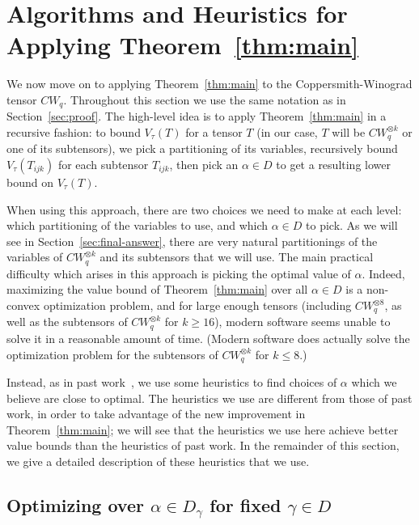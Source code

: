 \documentclass{theoretics}
\begin{document}
\section{Algorithms and Heuristics for Applying Theorem~\ref{thm:main}} \label{sec:heuristics}

We now move on to applying Theorem~\ref{thm:main} to the Coppersmith-Winograd tensor $CW_q$. Throughout this section we use the same notation as in Section~\ref{sec:proof}. The high-level idea is to apply Theorem~\ref{thm:main} in a recursive fashion: to bound $V_\tau(T)$ for a tensor $T$ (in our case, $T$ will be $CW_q^{\otimes k}$ or one of its subtensors), we pick a partitioning of its variables, recursively bound $V_\tau(T_{ijk})$ for each subtensor $T_{ijk}$, then pick an $\alpha \in D$ to get a resulting lower bound on $V_\tau(T)$.

When using this approach, there are two choices we need to make at each level: which partitioning of the variables to use, and which $\alpha \in D$ to pick. As we will see in Section~\ref{sec:final-answer}, there are very natural partitionings of the variables of $CW_q^{\otimes k}$ and its subtensors that we will use. The main practical difficulty which arises in this approach is picking the optimal value of $\alpha$. Indeed, maximizing the value bound of Theorem~\ref{thm:main} over all $\alpha \in D$ is a non-convex optimization problem, and for large enough tensors (including $CW_q^{\otimes 8}$, as well as the subtensors of $CW_q^{\otimes k}$ for $k \geq 16$), modern software seems unable to solve it in a reasonable amount of time. (Modern software does actually solve the optimization problem for the subtensors of $CW_q^{\otimes k}$ for $k\leq 8$.)

Instead, as in past work~\cite{v12,legall}, we use some heuristics to find choices of $\alpha$ which we believe are close to optimal. The heuristics we use are different from those of past work, in order to take advantage of the new improvement in Theorem~\ref{thm:main}; we will see that the heuristics we use here achieve better value bounds than the heuristics of past work. In the remainder of this section, we give a detailed description of these heuristics that we use.

\subsection{Optimizing over \texorpdfstring{$\alpha \in D_{\gamma}$}{alpha in D gamma} for fixed \texorpdfstring{$\gamma \in D$}{gamma in D}} \label{subsec:optgamma}
\end{document}
